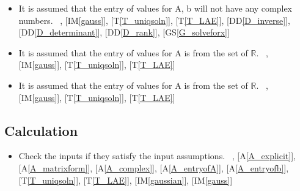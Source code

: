 \documentclass[12pt]{article}
\newcommand{\ddref}[1]{DD\ref{#1}}
\newcommand{\tref}[1]{T\ref{#1}}
\newcounter{assumpnum} %
\newcommand{\aref}[1]{A\ref{#1}}
\newcommand{\gsref}[1]{GS\ref{#1}}
\newcommand{\iref}[1]{IM\ref{#1}}
\newcounter{lcnum} %
\newcounter{calcnum} %
\begin{document}
{\begin{itemize}

\item[A\refstepcounter{assumpnum}\theassumpnum \label{A_complex}:]
It is assumed that the entry of values for A, b will not have any complex numbers.
~\newline
 [\iref{gaussian}], [\iref{gauss}], [\tref{T_uniqsoln}], [\tref{T_LAE}], [\ddref{D_inverse}], [\ddref{D_determinant}], [\ddref{D_rank}], [\gsref{G_solveforx}]


\item[A\refstepcounter{assumpnum}\theassumpnum \label{A_entryofA}:]
It is assumed that the entry of values for A is from the set of $\mathbb{R}$.
~\newline
 [\iref{gaussian}], [\iref{gauss}], [\tref{T_uniqsoln}], [\tref{T_LAE}]


\item[A\refstepcounter{assumpnum}\theassumpnum \label{A_entryofb}:]
It is assumed that the entry of values for A is from the set of $\mathbb{R}$.
~\newline
 [\iref{gaussian}], [\iref{gauss}], [\tref{T_uniqsoln}], [\tref{T_LAE}]



\end{itemize}

\subsection{Calculation} \label{sec_Calculation}    

\begin{itemize}
\item[C\refstepcounter{calcnum}\thecalcnum \label{C_inputs}:]
Check the inputs if they satisfy the input assumptions.
~\newline
[\gsref{G_solveforx}], [\aref{A_explicit}], [\aref{A_matrixform}],
[\aref{A_complex}], [\aref{A_entryofA}], [\aref{A_entryofb}],
[\tref{T_uniqsoln}], [\tref{T_LAE}], [\iref{gaussian}], [\iref{gauss}]


\end{itemize}}
\end{document}
